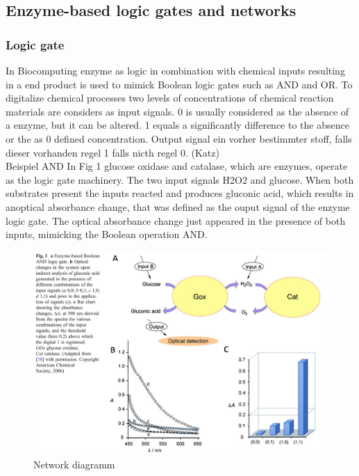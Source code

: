 \documentclass[runningheads]{llncs}
\begin{document}
\subsection{Enzyme-based logic gates and networks}
	
	\subsubsection{Logic gate}
	
	In Biocomputing enzyme as logic in combination with chemical inputs resulting in a end product is used to mimick Boolean logic gates such as AND and OR. To digitalize chemical processes two levels of concentrations of chemical reaction materials are considers as input signals. 0 is usually considered as the absence of a enzyme, but it can be altered. 1 equals a  significantly difference to the absence or the as 0 defined concentration.
	Output signal ein vorher bestimmter stoff, falls dieser vorhanden regel 1 falls nicth regel 0.  
	(Katz) \\
	
	Beispiel AND 
	In Fig 1 glucose oxidase and catalase, which are enzymes, operate as the logic gate machinery. The two input signals H2O2 and glucose. When both substrates present the inputs reacted and produces gluconic acid, which results in anoptical absorbance change, that was defined as the ouput signal of the enzyme logic gate. The optical absorbance change just appeared in the presence of both inputs, mimicking the Boolean operation AND. 

	\begin{figure} \centering \includegraphics[scale= 0.3]{pics/AND.png} \caption{Network diagramm} \label{img:and} \end{figure}
	
\end{document}
